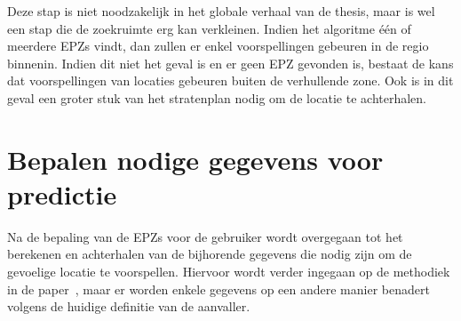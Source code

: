 Deze stap is niet noodzakelijk in het globale verhaal van de thesis, maar is
wel een stap die de zoekruimte erg kan verkleinen. Indien het algoritme één of
meerdere \acp{EPZ} vindt, dan zullen er enkel voorspellingen gebeuren in de
regio binnenin. Indien dit niet het geval is en er geen \ac{EPZ} gevonden is,
bestaat de kans dat voorspellingen van locaties gebeuren buiten de verhullende
zone. Ook is in dit geval een groter stuk van het stratenplan nodig om de
locatie te achterhalen.

\section{Bepalen nodige gegevens voor predictie}
Na de bepaling van de \acp{EPZ} voor de gebruiker wordt overgegaan tot het
berekenen en achterhalen van de bijhorende gegevens die nodig zijn om de
gevoelige locatie te voorspellen. Hiervoor wordt verder ingegaan op de
methodiek in de
paper~\citeauthor{Dhondt_Pochat_Voulimeneas_Joosen_Volckaert_2022}, maar er
worden enkele gegevens op een andere manier benadert volgens de huidige
definitie van de aanvaller.

